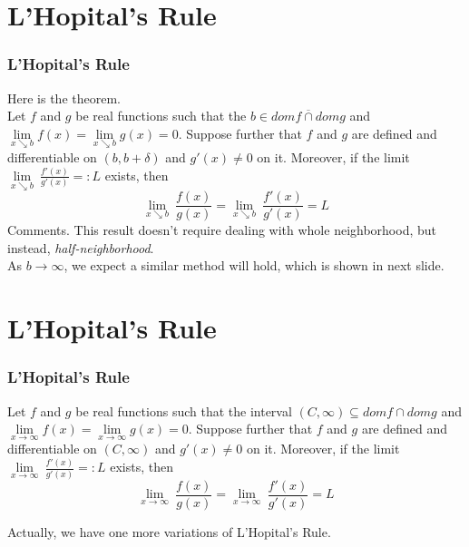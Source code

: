 \documentclass[12pt, t]{beamer}
\renewcommand{\emph}[1]{{\color{Turquoise3}\textsl{#1}}}
\begin{document}
\section{L'Hopital's Rule}
\begin{frame}
    \frametitle{L'Hopital's Rule}
    Here is the theorem.\\
    \hspace{1em}
    Let $f$ and $g$ be real functions such that the $b\in\overline{domf\cap domg}$ and
    $\underset{x\searrow b}{\lim}f(x)=\underset{x\searrow b}{\lim}g(x)=0$. Suppose further that $f$ and $g$ are defined and differentiable on
    $(b,b+\delta)$ and $g'(x)\neq 0$ on it. Moreover, if the limit $\underset{x\searrow b}{\lim}\ \frac{f'(x)}{g'(x)}=:L$ exists, then
    \begin{equation*}
        \underset{x\searrow b}{\lim}\ \frac{f(x)}{g(x)}=\underset{x\searrow b}{\lim}\ \frac{f'(x)}{g'(x)}=L
    \end{equation*}
    Comments. This result doesn't require dealing with whole neighborhood, but instead, \emph{half-neighborhood}.\\
    \vspace{0.5em}
    \hspace{1em}
    As $b\rightarrow \infty$, we expect a similar method will hold, which is shown in next slide.
\end{frame}

\section{L'Hopital's Rule}
\begin{frame}
    \frametitle{L'Hopital's Rule}
    Let $f$ and $g$ be real functions such that the interval $(C,\infty)\subseteq domf\cap domg$ and
    $\underset{x\rightarrow \infty }{\lim}f(x)=\underset{x\rightarrow \infty }{\lim}g(x)=0$. Suppose further that $f$ and $g$ are defined
    and differentiable on $(C,\infty)$ and $g'(x)\neq 0$ on it. Moreover, if the limit $\underset{x\rightarrow \infty }{\lim}\ \frac{f'(x)}{g'(x)}=:L$ exists, then
    \begin{equation*}
        \underset{x\rightarrow\infty}{\lim}\ \frac{f(x)}{g(x)}=\underset{x\rightarrow\infty}{\lim}\ \frac{f'(x)}{g'(x)}=L
    \end{equation*}

    \vspace{0.5em}
    \hspace{1em}
    Actually, we have one more variations of L'Hopital's Rule.
\end{frame}
\end{document}
